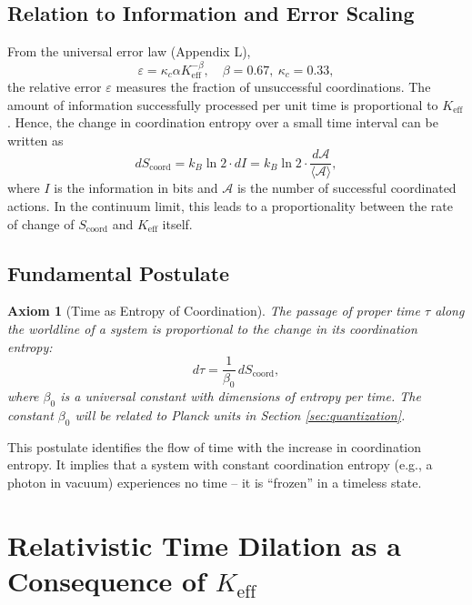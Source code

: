 \documentclass[12pt,a4paper]{article}
\newtheorem{axiom}[theorem]{Axiom}
\newcommand{\Keff}{K_{\mathrm{eff}}}
\newcommand{\kappac}{\kappa_c}
\newcommand{\Scoord}{S_{\mathrm{coord}}}
\begin{document}
	\subsection{Relation to Information and Error Scaling}
	
	From the universal error law (Appendix L),
	\begin{equation}
		\varepsilon = \kappac \alpha \Keff^{-\beta}, \quad \beta = 0.67,\ \kappac = 0.33,
	\end{equation}
	the relative error \(\varepsilon\) measures the fraction of unsuccessful coordinations. The amount of information successfully processed per unit time is proportional to \(\Keff\). Hence, the change in coordination entropy over a small time interval can be written as
	\begin{equation}
		d\Scoord = k_B \ln 2 \cdot dI = k_B \ln 2 \cdot \frac{d\mathcal{A}}{\langle \mathcal{A} \rangle},
	\end{equation}
	where \(I\) is the information in bits and \(\mathcal{A}\) is the number of successful coordinated actions. In the continuum limit, this leads to a proportionality between the rate of change of \(\Scoord\) and \(\Keff\) itself.
	
	\subsection{Fundamental Postulate}
	
	\begin{axiom}[Time as Entropy of Coordination]
		The passage of proper time \(\tau\) along the worldline of a system is proportional to the change in its coordination entropy:
		\begin{equation}
			d\tau = \frac{1}{\beta_0} \, d\Scoord,
			\label{eq:time_entropy}
		\end{equation}
		where \(\beta_0\) is a universal constant with dimensions of entropy per time. The constant \(\beta_0\) will be related to Planck units in Section \ref{sec:quantization}.
	\end{axiom}
	
	This postulate identifies the flow of time with the increase in coordination entropy. It implies that a system with constant coordination entropy (e.g., a photon in vacuum) experiences no time – it is “frozen” in a timeless state.
	
	\section{Relativistic Time Dilation as a Consequence of \texorpdfstring{\(\Keff\)}{Keff}}
	\label{sec:sr}
	
\end{document}
